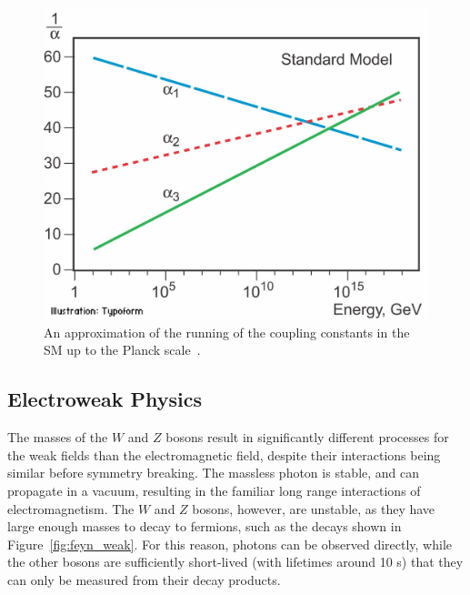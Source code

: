 \begin{figure}
\centering
\includegraphics[width=\fullfig]{figures/unification_sm.jpg}
\caption{An approximation of the running of the coupling constants in the \acs*{SM} up to the Planck scale~\cite{unification_plot}.}
\label{fig:unification_sm}
\end{figure}


\subsection{Electroweak Physics}

The masses of the $W$ and $Z$ bosons result in significantly different processes for the weak fields than the electromagnetic field, despite their interactions being similar before symmetry breaking.
The massless photon is stable, and can propagate in a vacuum, resulting in the familiar long range interactions of electromagnetism.
The $W$ and $Z$ bosons, however, are unstable, as they have large enough masses to decay to fermions, such as the decays shown in Figure~\ref{fig:feyn_weak}.
For this reason, photons can be observed directly, while the other bosons are sufficiently short-lived (with lifetimes around 10 s) that they can only be measured from their decay products.

